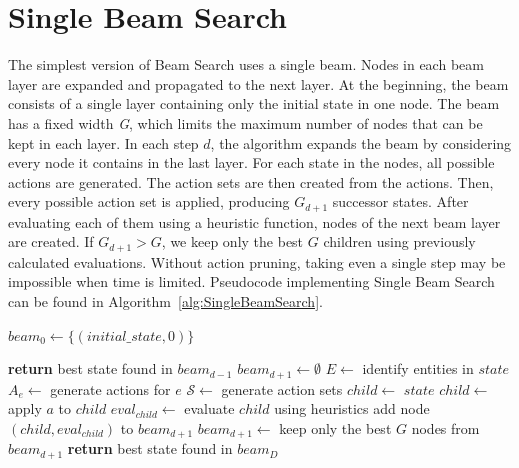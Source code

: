 \documentclass[shortabstract, mgr, english]{iithesis}
\begin{document}
\section{Single Beam Search}
The simplest version of Beam Search uses a single beam. Nodes in each beam layer are expanded and propagated to the next layer. At the beginning, the beam consists of a single layer containing only the initial state in one node. The beam has a fixed width \emph{G}, which limits the maximum number of nodes that can be kept in each layer. In each step $d$, the algorithm expands the beam by considering every node it contains in the last layer. For each state in the nodes, all possible actions are generated. The action sets are then created from the actions. Then, every possible action set is applied, producing $G_{d+1}$ successor states. After evaluating each of them using a heuristic function, nodes of the next beam layer are created. If $G_{d+1} > G$, we keep only the best $G$ children using previously calculated evaluations. Without action pruning, taking even a single step may be impossible when time is limited. Pseudocode implementing Single Beam Search can be found in Algorithm~\ref{alg:SingleBeamSearch}.

\begin{algorithm}
\caption{Single Beam Search}
\label{alg:SingleBeamSearch}
\begin{algorithmic}[1]
    \State $beam_0 \gets \{(initial\_state, 0)\}$ 

            \State \textbf{return} best state found in $beam_{d-1}$
        \EndIf
        \State $beam_{d+1} \gets \emptyset$ 
            \State $E \gets$ identify entities in $state$
                \State $A_e \gets$ generate actions for $e$
            \EndFor
            \State $\mathcal{S} \gets$ generate action sets
                \State $child \gets$ $state$
                    \State $child \gets$ apply $a$ to $child$
                \EndFor                
                \State $eval_{child} \gets$ evaluate $child$ using heuristics
                \State add node $(child, eval_{child})$ to $beam_{d+1}$
            \EndFor
        \EndFor
        \State {} 
            \State $beam_{d+1} \gets$ keep only the best $G$ nodes from $beam_{d+1}$
        \EndIf
    \EndFor
    \State \textbf{return} best state found in $beam_D$
\EndProcedure
\end{algorithmic}
\end{algorithm}
\end{document}
